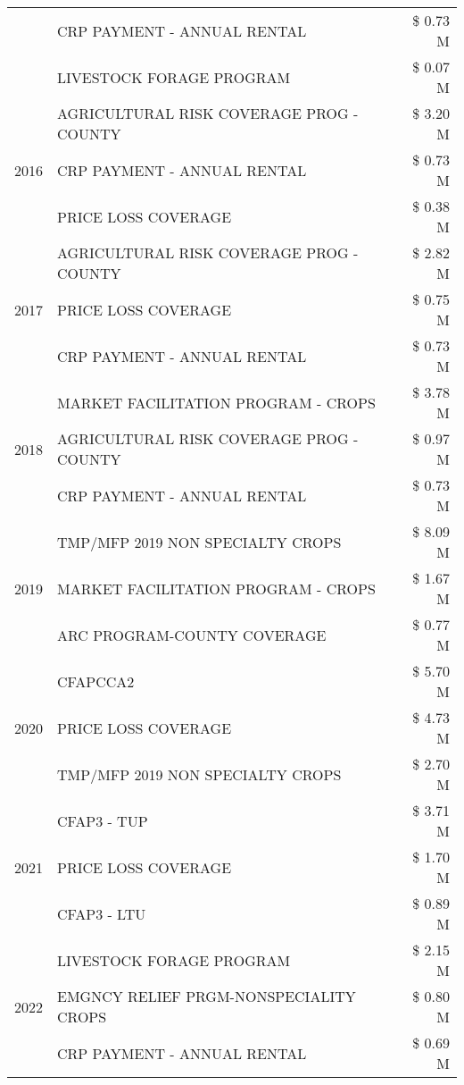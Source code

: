 \begin{tabular}{llr}
 & CRP PAYMENT - ANNUAL RENTAL & \$ 0.73 M \\
 & LIVESTOCK FORAGE PROGRAM & \$ 0.07 M \\
\cline{1-3}
\multirow[t]{3}{*}{2016} & AGRICULTURAL RISK COVERAGE PROG - COUNTY & \$ 3.20 M \\
 & CRP PAYMENT - ANNUAL RENTAL & \$ 0.73 M \\
 & PRICE LOSS COVERAGE & \$ 0.38 M \\
\cline{1-3}
\multirow[t]{3}{*}{2017} & AGRICULTURAL RISK COVERAGE PROG - COUNTY & \$ 2.82 M \\
 & PRICE LOSS COVERAGE & \$ 0.75 M \\
 & CRP PAYMENT - ANNUAL RENTAL & \$ 0.73 M \\
\cline{1-3}
\multirow[t]{3}{*}{2018} & MARKET FACILITATION PROGRAM - CROPS & \$ 3.78 M \\
 & AGRICULTURAL RISK COVERAGE PROG - COUNTY & \$ 0.97 M \\
 & CRP PAYMENT - ANNUAL RENTAL & \$ 0.73 M \\
\cline{1-3}
\multirow[t]{3}{*}{2019} & TMP/MFP 2019 NON SPECIALTY CROPS & \$ 8.09 M \\
 & MARKET FACILITATION PROGRAM - CROPS & \$ 1.67 M \\
 & ARC PROGRAM-COUNTY COVERAGE & \$ 0.77 M \\
\cline{1-3}
\multirow[t]{3}{*}{2020} & CFAPCCA2 & \$ 5.70 M \\
 & PRICE LOSS COVERAGE & \$ 4.73 M \\
 & TMP/MFP 2019 NON SPECIALTY CROPS & \$ 2.70 M \\
\cline{1-3}
\multirow[t]{3}{*}{2021} & CFAP3 - TUP & \$ 3.71 M \\
 & PRICE LOSS COVERAGE & \$ 1.70 M \\
 & CFAP3 - LTU & \$ 0.89 M \\
\cline{1-3}
\multirow[t]{3}{*}{2022} & LIVESTOCK FORAGE PROGRAM & \$ 2.15 M \\
 & EMGNCY RELIEF PRGM-NONSPECIALITY CROPS & \$ 0.80 M \\
 & CRP PAYMENT - ANNUAL RENTAL & \$ 0.69 M \\
\cline{1-3}
\bottomrule
\end{tabular}

